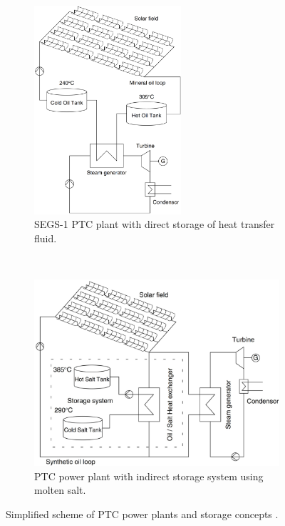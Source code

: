 \documentclass[Master,MEE,english]{twbook}%
\begin{document}
\begin{figure}[!ht]
        \centering
        \begin{subfigure}[b]{0.5\textwidth}
                \centering
                \includegraphics[width=0.6\textwidth]{FIG/troughdirecttwotank}
                \caption{SEGS-1 PTC plant with direct storage of heat transfer fluid.}\label{troughdirecttwotank}
        \end{subfigure}%
        ~
        \begin{subfigure}[b]{0.5\textwidth}
                \centering
                \includegraphics[width=1\textwidth]{FIG/troughtindirecttwotank}
                \caption{PTC power plant with indirect storage system using molten salt.}\label{troughtindirecttwotank}
        \end{subfigure}
        \caption[Simplified scheme of PTC power plants and storage concepts.]{Simplified scheme of PTC power plants and storage concepts \cite{Steinmann2012}.}\label{storageconceptstrough}
\end{figure}
\end{document}
